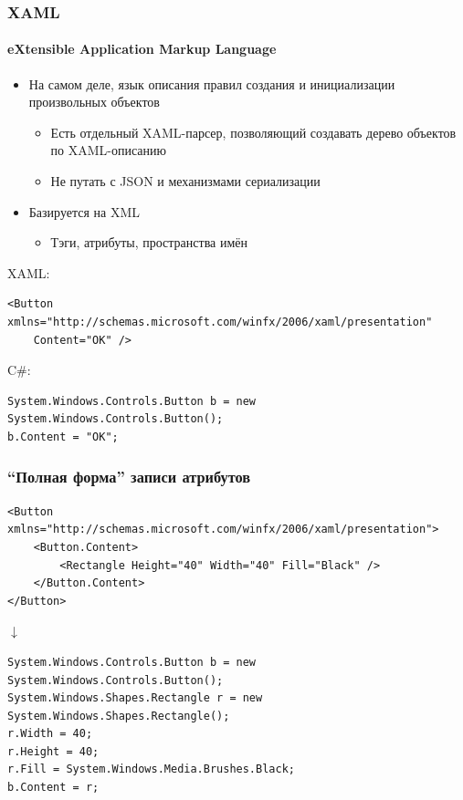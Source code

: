 \documentclass[xetex,mathserif,serif]{beamer}
\newcommand{\DownArrow} {
    \hspace{2cm}\begin{LARGE}$\downarrow$\end{LARGE}
}
\begin{document}
    \begin{frame}[fragile]
        \frametitle{XAML}
        \framesubtitle{eXtensible Application Markup Language}
        \begin{itemize}
            \item На самом деле, язык описания правил создания и инициализации произвольных объектов
            \begin{itemize}
                \item Есть отдельный XAML-парсер, позволяющий создавать дерево объектов по XAML-описанию
                \item Не путать с JSON и механизмами сериализации
            \end{itemize}
            \item Базируется на XML
            \begin{itemize}
                \item Тэги, атрибуты, пространства имён
            \end{itemize}
        \end{itemize}

        XAML:
        \begin{footnotesize}
            \begin{verbatim}
<Button xmlns="http://schemas.microsoft.com/winfx/2006/xaml/presentation"
    Content="OK" />
            \end{verbatim}
        \end{footnotesize}

        C\#:
        \begin{footnotesize}
            \begin{verbatim}
System.Windows.Controls.Button b = new System.Windows.Controls.Button();
b.Content = "OK";
            \end{verbatim}
        \end{footnotesize}
    \end{frame}

    \begin{frame}[fragile]
        \frametitle{``Полная форма'' записи атрибутов}
        \begin{footnotesize}
            \begin{verbatim}
<Button xmlns="http://schemas.microsoft.com/winfx/2006/xaml/presentation">
    <Button.Content>
        <Rectangle Height="40" Width="40" Fill="Black" />
    </Button.Content>
</Button>
            \end{verbatim}
        \end{footnotesize}

        \DownArrow
        \begin{footnotesize}
            \begin{verbatim}
System.Windows.Controls.Button b = new System.Windows.Controls.Button();
System.Windows.Shapes.Rectangle r = new System.Windows.Shapes.Rectangle();
r.Width = 40;
r.Height = 40;
r.Fill = System.Windows.Media.Brushes.Black;
b.Content = r;
            \end{verbatim}
        \end{footnotesize}
    \end{frame}
\end{document}
